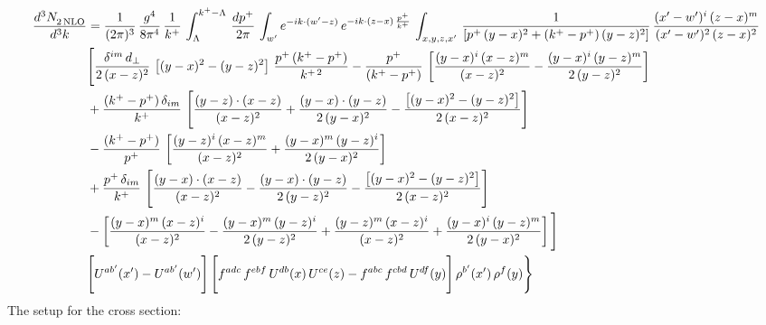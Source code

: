 \documentclass[9pt]{article}
\numberwithin{equation}{section}
\begin{document}
\begin{align}
    \frac{d^{3}N_{2\,\rm NLO}^{\rm}}{d^{3}k}  & =  \frac{1}{(2\pi)^{3}}\,\frac{g^{4}}{8\pi^{4}}\,\frac{1}{k^{+}}\,\int_{\Lambda}^{k^{+}-\Lambda}\, \frac{dp^{+}}{2\pi} \,\int_{ w^\prime} e^{-ik\cdot(w'-z)}\,e^{-ik\cdot (z-x)\,\frac{p^{+}}{k^{+}}}\, \int_{x,y,z,x'}\,\frac{1}{\left[p^{+}\,(y-x)^{2}+(k^{+}-p^{+})\,(y-z)^{2}\right]}\, \frac{(x'-w')^{i}\,(z-x)^{m}}{(x'-w')^{2}\,(z-x)^{2}} \notag \\ & \Bigg[\frac{\delta^{im}\,d_{\perp}}{2\,(x-z)^{2}}\,\left[(y-x)^{2}-(y-z)^{2}\right]\,\frac{p^{+}\,(k^{+}-p^{+})}{k^{+\,2}}-\frac{p^{+}}{(k^{+}-p^{+})}\,\left[\frac{(y-x)^{i}\,(x-z)^{m}}{(x-z)^{2}}-\frac{(y-x)^{i}\,(y-z)^{m}}{2\,(y-z)^{2}}\right]\notag \\ & +\frac{(k^{+}-p^{+})\,\delta_{im}}{k^{+}}\,\left[\frac{(y-z)\cdot (x-z)}{(x-z)^{2}}+\frac{(y-x)\cdot (y-z)}{2\,(y-x)^{2}}-\frac{\left[(y-x)^{2}-(y-z)^{2}\right]}{2\,(x-z)^{2}}\right]\notag \\ & -\frac{(k^{+}-p^{+})}{p^{+}}\,\left[\frac{(y-z)^{i}\,(x-z)^{m}}{(x-z)^{2}}+\frac{(y-x)^{m}\,(y-z)^{i}}{2\,(y-x)^{2}}\right]\notag \\ & +\frac{p^{+}\,\delta_{im}}{k^{+}}\,\left[\frac{(y-x)\cdot (x-z)}{(x-z)^{2}}-\frac{(y-x)\cdot (y-z)}{2\,(y-z)^{2}}-\frac{\left[(y-x)^{2}-(y-z)^{2}\right]}{2\,(x-z)^{2}}\right]\notag \\ &-\left[\frac{(y-x)^{m}\,(x-z)^{i}}{(x-z)^{2}}-\frac{(y-x)^{m}\,(y-z)^{i}}{2\,(y-z)^{2}}+\frac{(y-z)^{m}\,(x-z)^{i}}{(x-z)^{2}}+\frac{(y-x)^{i}\,(y-z)^{m}}{2\,(y-x)^{2}}\right]\Bigg] \notag \\ & \Bigg[U^{ab'}(x')-U^{ab'}(w')\Bigg]\,\Bigg[f^{adc}\,f^{ebf}\,U^{db}(x)\,U^{ce}(z)-f^{abc}\,f^{cbd}\,U^{df}(y)\Bigg]\,\rho^{b'}(x')\,\rho^{f}(y)\Bigg\}
\end{align}
The setup for the cross section: 
\end{document}
